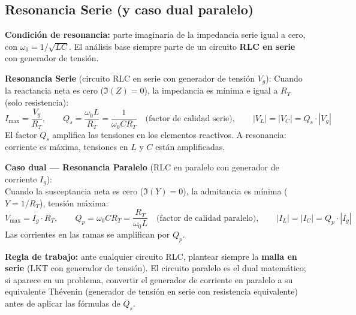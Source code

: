 \documentclass[12pt,a4paper]{article}
\begin{document}
\subsection{Resonancia Serie (y caso dual paralelo)}

\textbf{Condición de resonancia:} parte imaginaria de la impedancia serie igual a cero,
con $\omega_0 = 1/\!\sqrt{LC}$. El análisis base siempre parte de un circuito
\textbf{RLC en serie} con generador de tensión.

\begin{formulabox}
\textbf{Resonancia Serie} (circuito RLC en serie con generador de tensión $V_g$):
Cuando la reactancia neta es cero ($\Im(Z) = 0$), la impedancia es mínima e igual a $R_T$ (solo resistencia):
\[
  I_{\max} = \frac{V_g}{R_T}, \qquad
  Q_s = \frac{\omega_0 L}{R_T} = \frac{1}{\omega_0 C R_T} \quad\text{(factor de calidad serie)}, \qquad
  |V_L| = |V_C| = Q_s\cdot|V_g|
\]
El factor $Q_s$ amplifica las tensiones en los elementos reactivos. A resonancia: corriente es máxima, tensiones en $L$ y $C$ están amplificadas.

\medskip
\textbf{Caso dual — Resonancia Paralelo} (RLC en paralelo con generador de corriente $I_g$):\\[4pt]
Cuando la susceptancia neta es cero ($\Im(Y) = 0$), la admitancia es mínima ($Y = 1/R_T$), tensión máxima:
\[
  V_{\max} = I_g\cdot R_T, \qquad
  Q_p = \omega_0 C R_T = \frac{R_T}{\omega_0 L} \quad\text{(factor de calidad paralelo)}, \qquad
  |I_L| = |I_C| = Q_p\cdot|I_g|
\]
Las corrientes en las ramas se amplifican por $Q_p$.
\end{formulabox}

\begin{warnbox}
\textbf{\color{warnorangeline}Regla de trabajo:} ante cualquier circuito RLC,
plantear siempre la \textbf{malla en serie} (LKT con generador de tensión).
El circuito paralelo es el dual matemático; si aparece en un problema,
convertir el generador de corriente en paralelo a su equivalente Thévenin
(generador de tensión en serie con resistencia equivalente) antes de aplicar las fórmulas de $Q_s$.
\end{warnbox}
\end{document}

